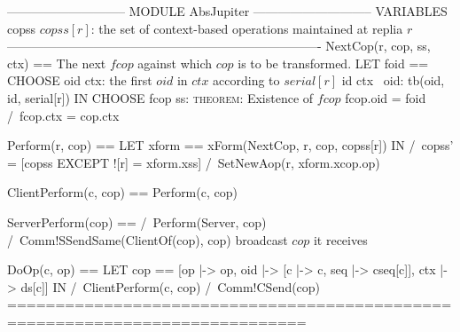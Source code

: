 \documentclass{article}
\begin{document}
\begin{tla}
----------------------------- MODULE AbsJupiter -----------------------------
VARIABLES copss \* $copss[r]$: the set of context-based operations maintained at replia $r$
----------------------------------------------------------------------------
NextCop(r, cop, ss, ctx) == \* The next $fcop$ against which $cop$ is to be transformed.
    LET foid == CHOOSE oid \in ctx: \* the first $oid$ in $ctx$ according to $serial[r]$
                    \A id \in ctx \ {oid}: tb(oid, id, serial[r])
    IN  CHOOSE fcop \in ss: \* \textsc{theorem}: Existence of $fcop$
            fcop.oid = foid /\ fcop.ctx = cop.ctx 

Perform(r, cop) ==
    LET xform == xForm(NextCop, r, cop, copss[r])
    IN  /\ copss' = [copss EXCEPT ![r] = xform.xss]
        /\ SetNewAop(r, xform.xcop.op)
        
ClientPerform(c, cop) == Perform(c, cop)
        
ServerPerform(cop) == 
    /\ Perform(Server, cop)
    /\ Comm!SSendSame(ClientOf(cop), cop) \* broadcast $cop$ it receives

DoOp(c, op) ==
    LET cop == [op |-> op, oid |-> [c |-> c, seq |-> cseq[c]], ctx |-> ds[c]]
    IN  /\ ClientPerform(c, cop)
        /\ Comm!CSend(cop) 
=============================================================================
\end{tla}
\end{document}
